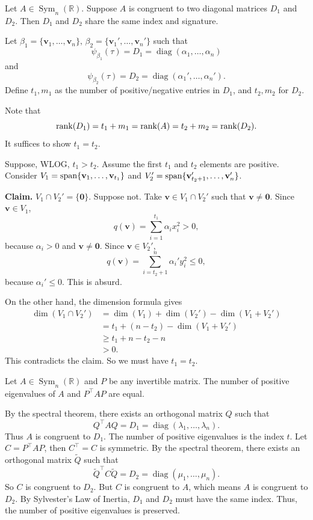 \begin{theorem}
Let $A\in \operatorname{Sym}_n(\mathbb{R})$. Suppose $A$ is congruent to two diagonal matrices $D_1$ and $D_2$. Then $D_1$ and $D_2$ share the same index and signature.
\end{theorem}

\begin{pfbox}
Let $\beta_1=\{\mathbf{v}_1,\dots,\mathbf{v}_n\},
\,
\beta_2=\{\mathbf{v}_1',\dots,\mathbf{v}_n'\}$
such that
\[
\psi_{\beta_1}(\tau)
=
D_1
=
\operatorname{diag}(\alpha_1,\dots,\alpha_n)
\]
and
\[
\psi_{\beta_2}(\tau)
=
D_2
=
\operatorname{diag}(\alpha_1',\dots,\alpha_n').
\]
Define $t_1,m_1$ as the number of positive/negative entries in $D_1$, and $t_2,m_2$ for $D_2$.

Note that
\[
\operatorname{rank}(D_1)
=
 t_1+m_1
=
\operatorname{rank}(A)
=
 t_2+m_2
=
\operatorname{rank}(D_2).
\]
It suffices to show $t_1=t_2$.

Suppose, WLOG, $t_1>t_2$. Assume the first $t_1$ and $t_2$ elements are positive. Consider
$V_1=\operatorname{span}\{\mathbf{v}_1,\dots,\mathbf{v}_{t_1}\}$ and
$V_2'=\operatorname{span}\{\mathbf{v}_{t_2+1}',\dots,\mathbf{v}_n'\}$.

\textbf{Claim.} $V_1\cap V_2'=\{\mathbf{0}\}$.
Suppose not. Take $\mathbf{v}\in V_1\cap V_2'$ such that $\mathbf{v}\ne \mathbf{0}$. Since $\mathbf{v}\in V_1$,
\[
q(\mathbf{v})
=
\sum_{i=1}^{t_1}\alpha_i x_i^2
>
0,
\]
because $\alpha_i>0$ and $\mathbf{v}\ne \mathbf{0}$. Since $\mathbf{v}\in V_2'$,
\[
q(\mathbf{v})
=
\sum_{i=t_2+1}^n \alpha_i' y_i^2
\le
0,
\]
because $\alpha_i'\le 0$. This is absurd.

On the other hand, the dimension formula gives
\begin{align*}
\dim(V_1\cap V_2')
&=
\dim(V_1)+\dim(V_2')-\dim(V_1+V_2') \\
&=
 t_1+(n-t_2)-\dim(V_1+V_2') \\
&\ge
 t_1+n-t_2-n \\
&>
0.
\end{align*}
This contradicts the claim. So we must have $t_1=t_2$.
\end{pfbox}


\begin{theorem}
Let $A\in \operatorname{Sym}_n(\mathbb{R})$ and $P$ be any invertible matrix. The number of positive eigenvalues of $A$ and $P^\top AP$ are equal.
\end{theorem}

\begin{pfbox}
By the spectral theorem, there exists an orthogonal matrix $Q$ such that
\[
Q^\top AQ
=
D_1
=
\operatorname{diag}(\lambda_1,\dots,\lambda_n).
\]
Thus $A$ is congruent to $D_1$. The number of positive eigenvalues is the index $t$.
Let $C=P^\top AP$, then $C^\top=C$ is symmetric. By the spectral theorem, there exists an orthogonal matrix $\widetilde{Q}$ such that
\[
\widetilde{Q}^\top C\widetilde{Q}
=
D_2
=
\operatorname{diag}(\mu_1,\dots,\mu_n).
\]
So $C$ is congruent to $D_2$. But $C$ is congruent to $A$, which means $A$ is congruent to $D_2$.
By Sylvester's Law of Inertia, $D_1$ and $D_2$ must have the same index. Thus, the number of positive eigenvalues is preserved.
\end{pfbox}

